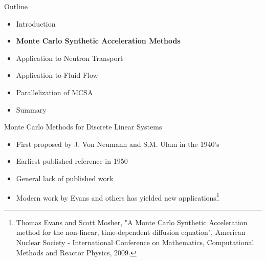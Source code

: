 \documentclass{beamer}
\begin{document}
\begin{frame}{Outline}

  \begin{itemize}
  \item Introduction
    \bigskip
  \item \textbf{Monte Carlo Synthetic Acceleration Methods}
    \bigskip
  \item Application to Neutron Transport
    \bigskip
  \item Application to Fluid Flow
    \bigskip
  \item Parallelization of MCSA
    \bigskip
  \item Summary
  \end{itemize}

\end{frame}

\begin{frame}{Monte Carlo Methods for Discrete Linear Systems}

  \begin{itemize}
  \item First proposed by J. Von Neumann and S.M. Ulam in the 1940's
    \medskip \medskip
  \item Earliest published reference in 1950
    \medskip \medskip
  \item General lack of published work
    \medskip \medskip
  \item Modern work by Evans and others has yielded new
    applications\let\thefootnote\relax\footnote{\tiny{Thomas Evans and
        Scott Mosher, "A Monte Carlo Synthetic Acceleration method for
        the non-linear, time-dependent diffusion equation", American
        Nuclear Society - International Conference on Mathematics,
        Computational Methods and Reactor Physics, 2009.}}
  \end{itemize}

\end{frame}
\end{document}
